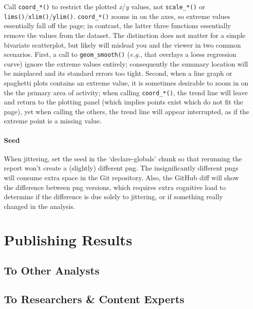 \documentclass[
]{book}
\begin{document}
Call \texttt{coord\_*()} to restrict the plotted \emph{x}/\emph{y} values, not \texttt{scale\_*()} or \texttt{lims()}/\texttt{xlim()}/\texttt{ylim()}. \texttt{coord\_*()} zooms in on the axes, so extreme values essentially fall off the page; in contrast, the latter three functions essentially remove the values from the dataset. The distinction does not matter for a simple bivariate scatterplot, but likely will mislead you and the viewer in two common scenarios. First, a call to \texttt{geom\_smooth()} (\emph{e.g.}, that overlays a loess regression curve) ignore the extreme values entirely; consequently the summary location will be misplaced and its standard errors too tight. Second, when a line graph or spaghetti plots contains an extreme value, it is sometimes desirable to zoom in on the the primary area of activity; when calling \texttt{coord\_*()}, the trend line will leave and return to the plotting panel (which implies points exist which do not fit the page), yet when calling the others, the trend line will appear interrupted, as if the extreme point is a missing value.

\hypertarget{style-ggplot-seed}{%
\subsubsection{Seed}\label{style-ggplot-seed}}

When jittering, set the seed in the `declare-globals' chunk so that rerunning the report won't create a (slightly) different png. The insignificantly different pngs will consume extra space in the Git repository. Also, the GitHub diff will show the difference between png versions, which requires extra cognitive load to determine if the difference is due solely to jittering, or if something really changed in the analysis.

\hypertarget{publication}{%
\chapter{Publishing Results}\label{publication}}

\hypertarget{publication-analysts}{%
\section{To Other Analysts}\label{publication-analysts}}

\hypertarget{publication-experts}{%
\section{To Researchers \& Content Experts}\label{publication-experts}}
\end{document}
